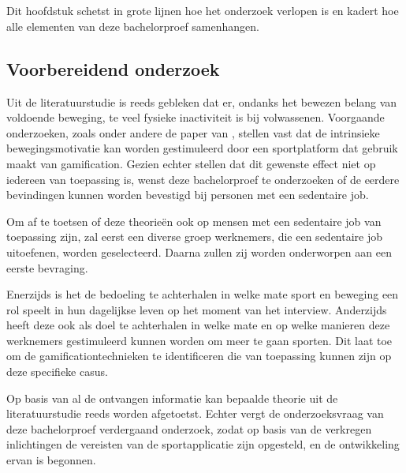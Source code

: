 
\chapter{}%
\label{ch:methodologie}

Dit hoofdstuk schetst in grote lijnen hoe het onderzoek verlopen is en kadert hoe alle elementen van deze bachelorproef samenhangen.

\section{Voorbereidend onderzoek}
Uit de literatuurstudie is reeds gebleken dat er, ondanks het bewezen belang van voldoende beweging, te veel fysieke inactiviteit is bij volwassenen. Voorgaande onderzoeken, zoals onder andere de paper van \textcite{Kari2016}, stellen vast dat de intrinsieke bewegingsmotivatie kan worden gestimuleerd door een sportplatform dat gebruik maakt van gamification. Gezien \textcite{Hamari2013} echter stellen dat dit gewenste effect niet op iedereen van toepassing is, wenst deze bachelorproef te onderzoeken of de eerdere bevindingen kunnen worden bevestigd bij personen met een sedentaire job.

Om af te toetsen of deze theorieën ook op mensen met een sedentaire job van toepassing zijn, zal eerst een diverse groep werknemers, die een sedentaire job uitoefenen, worden geselecteerd. Daarna zullen zij worden onderworpen aan een eerste bevraging.

Enerzijds is het de bedoeling te achterhalen in welke mate sport en beweging een rol speelt in hun dagelijkse leven op het moment van het interview. Anderzijds heeft deze ook als doel te achterhalen in welke mate en op welke manieren deze werknemers gestimuleerd kunnen worden om meer te gaan sporten. Dit laat toe om de gamificationtechnieken te identificeren die van toepassing kunnen zijn op deze specifieke casus.

Op basis van al de ontvangen informatie kan bepaalde theorie uit de literatuurstudie reeds worden afgetoetst. Echter vergt de onderzoeksvraag van deze bachelorproef verdergaand onderzoek, zodat op basis van de verkregen inlichtingen de vereisten van de sportapplicatie zijn opgesteld, en de ontwikkeling ervan is begonnen.

